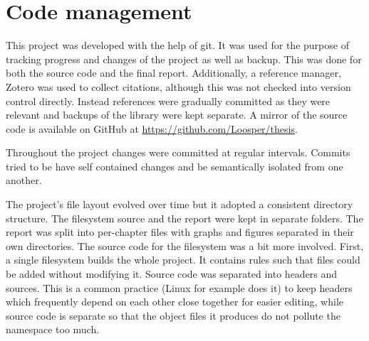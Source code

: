     \section{Code management}

        This project was developed with the help of git. It was used for the
        purpose of tracking progress and changes of the project as well as
        backup. This was done for both the source code and the final report.
        Additionally, a reference manager, Zotero \cite{zotero} was used to
        collect citations, although this was not checked into version control
        directly. Instead references were gradually committed as they were
        relevant and backups of the library were kept separate. A mirror of
        the source code is available on GitHub at \url{https://github.com/Loosper/thesis}.

        Throughout the project changes were committed at regular intervals.
        Commits tried to be have self contained changes and be semantically
        isolated from one another.

        The project's file layout evolved over time but it adopted a
        consistent directory structure. The filesystem source and the report
        were kept in separate folders. The report was split into per-chapter
        files with graphs and figures separated in their own directories. The
        source code for the filesystem was a bit more involved. First, a single
        filesystem builds the whole project. It contains rules such that files
        could be added without modifying it. Source code was separated into
        headers and sources. This is a common practice (Linux
        for example does it) to keep headers which
        frequently depend on each other close together for easier editing,
        while source code is separate so that the object files it produces do
        not pollute the namespace too much.
